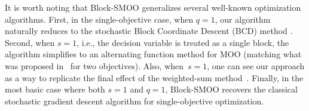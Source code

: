 \documentclass[11pt,a4paper]{article}
\numberwithin{equation}{section}%
\renewcommand{\(}{\left (}
\renewcommand{\)}{\right )}
\newcommand{\Fm}{F_m}
\begin{document}
It is worth noting that Block-SMOO generalizes several well-known optimization algorithms. First, in the single-objective case, when $q=1$, our algorithm naturally reduces to the stochastic Block Coordinate Descent (BCD) method \cite{xu2015blockstochasticgradientiteration}. Second, when $s=1$, i.e., the decision variable is treated as a single block, the algorithm simplifies to an alternating function method for MOO (matching what was proposed in~\cite{SLiu_LNVicente_2023} for two objectives). Also, when~$s=1$, one can see our approach as a way to replicate the final effect of the weighted-sum method~\cite{SGass_TSaaty_1955}. Finally, in the most basic case where both $s=1$ and $q=1$, Block-SMOO recovers the classical stochastic gradient descent algorithm for single-objective optimization.

\end{document}

